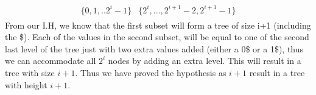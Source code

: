 \documentclass[12pt]{article}
\begin{document}
\begin{adjustwidth}{0em}{0pt}
\begin{align*}  
    \begin{aligned}
       \{0,1,.. 2^i-1\} & \{2^i, ..., 2^{i+1}-2, 2^{i+1}-1\}
    \end{aligned}
\end{align*}
From our I.H, we know that the first subset will form a tree of size i+1 (including the \$).  Each of the values in the second subset, will be equal to one of the second last level of the tree just with two extra values added (either a 0\$ or a 1\$), thus we can accommodate all $2^i$ nodes by adding an extra level. This will result in a tree with size $i+1$. Thus we have proved the hypothesis as $i+1$ result in a tree with height $i+1$.

\end{adjustwidth} 
\end{document}
